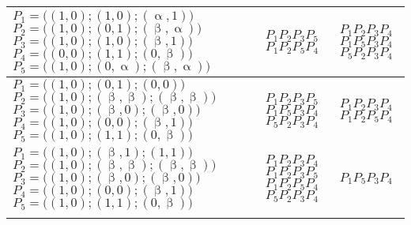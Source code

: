\begin{table}[H]
\begin{center}
\begin{tabular}{m{4.5cm}m{2.7cm}m{2.7cm}}
\midrule
$P_1 = \bigl((1,0);(1,0);(\upalpha,1)\bigr)$\newline
$P_2 = \bigl((1,0);(0,1);(\upbeta,\upalpha)\bigr)$\newline
$P_3 = \bigl((1,0);(1,0);(\upbeta,1)\bigr)$\newline
$P_4 = \bigl((0,0);(1,1);(0,\upbeta)\bigr)$\newline
$P_5 = \bigl((1,0);(0,\upalpha);(\upbeta,\upalpha)\bigr)$      &
                              $P_1P_2P_3P_5$\newline
                              $P_1P_2P_5P_4$&
                                              $P_1P_2P_3P_4$ \newline
                                              $P_1P_5P_3P_4$\newline
                                              $P_5P_2P_3P_4$\\
\midrule

$P_1 = \bigl((1,0);(0,1);(0,0)\bigr)$\newline
$P_2 = \bigl((1,0);(\upbeta,\upbeta);(\upbeta,\upbeta)\bigr)$\newline
$P_3 = \bigl((1,0);(\upbeta,0);(\upbeta,0)\bigr)$\newline
$P_4 = \bigl((1,0);(0,0);(\upbeta,1)\bigr)$\newline
$P_5 = \bigl((1,0);(1,1);(0,\upbeta)\bigr)$      &
                                  $P_1P_2P_3P_5$\newline
                                  $P_1P_5P_3P_4$\newline
                                  $P_5P_2P_3P_4$&
                                                          $P_1P_2P_3P_4$\newline
                                                          $P_1P_2P_5P_4$\\

\midrule
$P_1 = \bigl((1,0);(\upbeta,1);(1,1)\bigr)$\newline
$P_2 = \bigl((1,0);(\upbeta,\upbeta);(\upbeta,\upbeta)\bigr)$\newline
$P_3 = \bigl((1,0);(\upbeta,0);(\upbeta,0)\bigr)$\newline
$P_4 = \bigl((1,0);(0,0);(\upbeta,1)\bigr)$\newline
$P_5 = \bigl((1,0);(1,1);(0,\upbeta)\bigr)$      &
                                  $P_1P_2P_3P_4$\newline
                                  $P_1P_2P_3P_5$\newline
                                  $P_1P_2P_5P_4$\newline
                                  $P_5P_2P_3P_4$&
                                                            $P_1P_5P_3P_4$\\ \bottomrule\\
\end{tabular}
\end{center}
\end{table}
